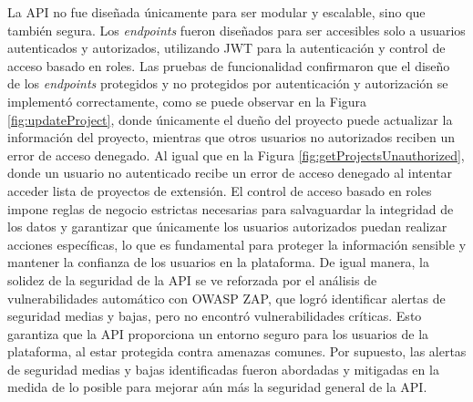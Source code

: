La API no fue diseñada únicamente para ser modular y escalable, sino que también segura. Los \textit{endpoints}
fueron diseñados para ser accesibles solo a usuarios autenticados y autorizados, utilizando JWT para la autenticación
y control de acceso basado en roles. Las pruebas de funcionalidad confirmaron que el diseño de los \textit{endpoints} 
protegidos y no protegidos por autenticación y autorización se implementó correctamente, como se puede observar en
la Figura \ref{fig:updateProject}, donde únicamente el dueño del proyecto puede actualizar la información del proyecto,
mientras que otros usuarios no autorizados reciben un error de acceso denegado. Al igual que en la Figura
\ref{fig:getProjectsUnauthorized}, donde un usuario no autenticado recibe un error de acceso denegado al intentar acceder 
lista de proyectos de extensión. El control de acceso basado en roles impone reglas de negocio estrictas necesarias
para salvaguardar la integridad de los datos y garantizar que únicamente los usuarios autorizados puedan realizar
acciones específicas, lo que es fundamental para proteger la información sensible y mantener la confianza de los
usuarios en la plataforma.
De igual manera, la solidez de la seguridad de la API se ve reforzada por el análisis de vulnerabilidades automático
con OWASP ZAP, que logró identificar alertas de seguridad medias y bajas, pero no encontró vulnerabilidades críticas.
Esto garantiza que la API proporciona un entorno seguro para los usuarios de la plataforma, al estar protegida contra
amenazas comunes. Por supuesto, las alertas de seguridad medias y bajas identificadas fueron abordadas y mitigadas en
la medida de lo posible para mejorar aún más la seguridad general de la API.

